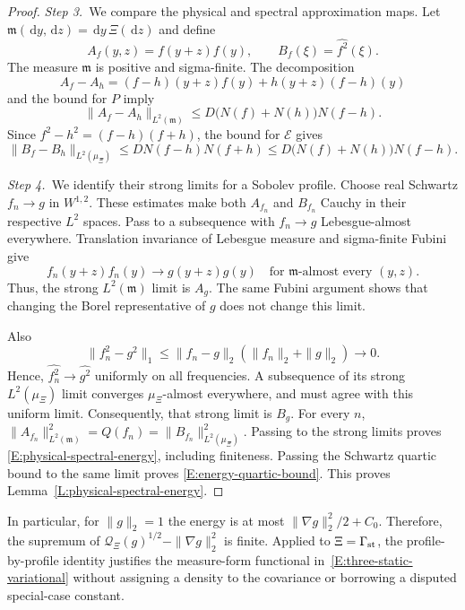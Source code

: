 \documentclass[12pt,oneside,openany]{book}
\numberwithin{equation}{section}
\theoremstyle{nogostyle}
\theoremstyle{definition}
\newcommand{\ud}{\,\mathrm{d}}
\begin{document}
\begin{proof}
  \medskip
  \noindent\textit{Step 3.~}We compare the physical and spectral approximation
  maps.
  Let $\mathfrak{m}(\ud y,\ud z) = \ud y\,\Xi(\ud z)$ and define
  \[
    A_f(y,z)=f(y+z)f(y),\qquad B_f(\xi)=\widehat{f^2}(\xi).
  \]
  The measure $\mathfrak{m}$ is positive and sigma-finite. The decomposition
  \[
    A_f-A_h=(f-h)(y+z)f(y)+h(y+z)(f-h)(y)
  \]
  and the bound for $P$ imply
  \[
    \|A_f-A_h\|_{L^2(\mathfrak{m})}
    \le D\bigl(N(f)+N(h)\bigr)N(f-h).
  \]
  Since $f^2-h^2 = (f-h)(f+h)$, the bound for $\mathscr{E}$ gives
  \[
    \|B_f-B_h\|_{L^2(\mu_\Xi)}
    \le D N(f-h)N(f+h)
    \le D\bigl(N(f)+N(h)\bigr)N(f-h).
  \]


  \medskip
  \noindent\textit{Step 4.~}We identify their strong limits for a Sobolev
  profile.
  Choose real Schwartz $f_n \to g$ in $W^{1,2}$. These estimates make both
  $A_{f_n}$ and $B_{f_n}$ Cauchy in their respective $L^2$ spaces. Pass to a
  subsequence with $f_n \to g$ Lebesgue-almost everywhere. Translation
  invariance of Lebesgue measure and sigma-finite Fubini give
  \[
    f_n(y+z)f_n(y)\longrightarrow g(y+z)g(y)
    \quad\text{for }\mathfrak{m}\text{-almost every }(y,z).
  \]
  Thus, the strong $L^2(\mathfrak{m})$ limit is $A_g$. The same Fubini argument
  shows that changing the Borel representative of $g$ does not change this
  limit.

  Also
  \[
    \|f_n^2-g^2\|_1
    \le\|f_n-g\|_2(\|f_n\|_2+\|g\|_2)\longrightarrow0.
  \]
  Hence, $\widehat{f_n^2} \to \widehat{g^2}$ uniformly on all frequencies. A
  subsequence of its strong $L^2(\mu_\Xi)$ limit converges $\mu_\Xi$-almost
  everywhere, and must agree with this uniform limit. Consequently, that strong
  limit is $B_g$. For every $n$, $\|A_{f_n}\|_{L^2(\mathfrak{m})}^2 = Q(f_n) =
  \|B_{f_n}\|_{L^2(\mu_\Xi)}^2$. Passing to the strong limits proves
  \eqref{E:physical-spectral-energy}, including finiteness. Passing the Schwartz
  quartic bound to the same limit proves \eqref{E:energy-quartic-bound}. This
  proves Lemma~\ref{L:physical-spectral-energy}.
\end{proof}

In particular, for $\|g\|_2 = 1$ the energy is at most $\|\nabla g\|_2^2/2+C_0$.
Therefore, the supremum of $\mathcal{Q}_\Xi(g)^{1/2}-\|\nabla g\|_2^2$ is
finite. Applied to $\Xi = \Gamma_{\rm st}$, the profile-by-profile identity
justifies the measure-form functional in~\eqref{E:three-static-variational}
without assigning a density to the covariance or borrowing a disputed
special-case constant.
\end{document}
